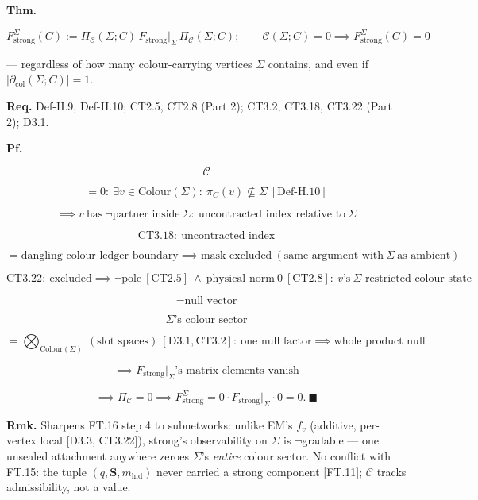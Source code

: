 \begin{theorem}\label{tag:FT-19}
\textbf{Thm.}

\[
F_{\mathrm{strong}}^\Sigma(C):=\Pi_{\mathcal C}(\Sigma;C)\,F_{\mathrm{strong}}\big|_\Sigma\,\Pi_{\mathcal C}(\Sigma;C);\qquad
\mathcal C(\Sigma;C)=0\implies F_{\mathrm{strong}}^\Sigma(C)=0
\]

— regardless of how many colour-carrying vertices $\Sigma$ contains, and even if $|\partial_{\mathrm{col}}(\Sigma;C)|=1$.

\textbf{Req.} Def-H.9, Def-H.10; CT2.5, CT2.8 (Part 2); CT3.2, CT3.18, CT3.22 (Part 2); D3.1.

\textbf{Pf.}

\[
\mathcal C
\]

\[
= 0:\ \exists v\in\mathrm{Colour}(\Sigma):\ \pi_C(v)\not\subseteq\Sigma\ [\mathrm{Def\text{-}H.10}]
\]

\[
\implies v\ \text{has}\ \neg\text{partner inside}\ \Sigma:\ \text{uncontracted index relative to}\ \Sigma
\]

\[
\mathrm{CT3.18}:\ \text{uncontracted index}
\]

\[
= \text{dangling colour-ledger boundary}\implies\text{mask-excluded}\ (\text{same argument with}\ \Sigma\ \text{as ambient})
\]

\[
\mathrm{CT3.22}:\ \text{excluded}\implies\neg\text{pole}\ [\mathrm{CT2.5}]\ \wedge\ \text{physical norm}\ 0\ [\mathrm{CT2.8}]:\ v\text{'s}\ \Sigma\text{-restricted colour state}
\]

\[
= \text{null vector}
\]

\[
\Sigma\text{'s colour sector}
\]

\[
= \bigotimes_{\mathrm{Colour}(\Sigma)}\ (\text{slot spaces})\ [\mathrm{D3.1},\mathrm{CT3.2}]:\ \text{one null factor}\implies\text{whole product null}
\]

\[
\implies F_{\mathrm{strong}}\big|_\Sigma\text{'s matrix elements vanish}
\]

\[
\implies\Pi_{\mathcal C}=0\implies F_{\mathrm{strong}}^\Sigma=0\cdot F_{\mathrm{strong}}\big|_\Sigma\cdot0=0.\ \blacksquare
\]

\textbf{Rmk.} Sharpens FT.16 step 4 to subnetworks: unlike EM's $f_v$ (additive, per-vertex local [D3.3, CT3.22]), strong's observability on $\Sigma$ is $\neg$gradable — one unsealed attachment anywhere zeroes $\Sigma$'s \textit{entire} colour sector. No conflict with FT.15: the tuple $(q,\mathbf S,m_{\mathrm{hid}})$ never carried a strong component [FT.11]; $\mathcal C$ tracks admissibility, not a value.


\end{theorem}
